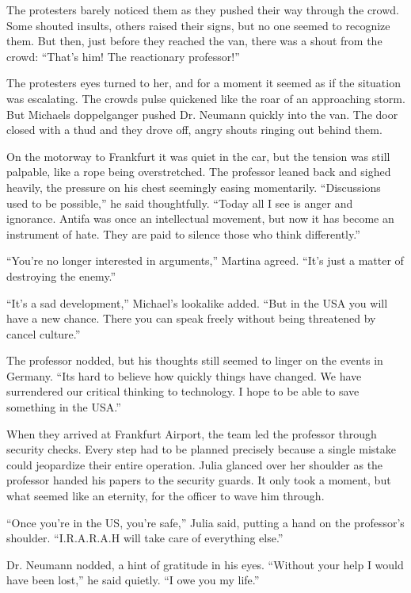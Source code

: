 \documentclass[
]{article}
\begin{document}
The protesters barely noticed them as they pushed their way through the
crowd. Some shouted insults, others raised their signs, but no one
seemed to recognize them. But then, just before they reached the van,
there was a shout from the crowd: ``That's him! The reactionary
professor!''

The protesters\textquotesingle{} eyes turned to her, and for a moment it
seemed as if the situation was escalating. The crowd\textquotesingle s
pulse quickened like the roar of an approaching storm. But
Michael\textquotesingle s doppelganger pushed Dr. Neumann quickly into
the van. The door closed with a thud and they drove off, angry shouts
ringing out behind them.

On the motorway to Frankfurt it was quiet in the car, but the tension
was still palpable, like a rope being overstretched. The professor
leaned back and sighed heavily, the pressure on his chest seemingly
easing momentarily. ``Discussions used to be possible,'' he said
thoughtfully. ``Today all I see is anger and ignorance. Antifa was once
an intellectual movement, but now it has become an instrument of hate.
They are paid to silence those who think differently.''

``You're no longer interested in arguments,'' Martina agreed. ``It's
just a matter of destroying the enemy.''

``It's a sad development,'' Michael's lookalike added. ``But in the USA
you will have a new chance. There you can speak freely without being
threatened by cancel culture.''

The professor nodded, but his thoughts still seemed to linger on the
events in Germany. ``It\textquotesingle s hard to believe how quickly
things have changed. We have surrendered our critical thinking to
technology. I hope to be able to save something in the USA.''

When they arrived at Frankfurt Airport, the team led the professor
through security checks. Every step had to be planned precisely because
a single mistake could jeopardize their entire operation. Julia glanced
over her shoulder as the professor handed his papers to the security
guards. It only took a moment, but what seemed like an eternity, for the
officer to wave him through.

``Once you're in the US, you're safe,'' Julia said, putting a hand on
the professor's shoulder. ``I.R.A.R.A.H will take care of everything
else.''

Dr. Neumann nodded, a hint of gratitude in his eyes. ``Without your help
I would have been lost,'' he said quietly. ``I owe you my life.''
\end{document}
